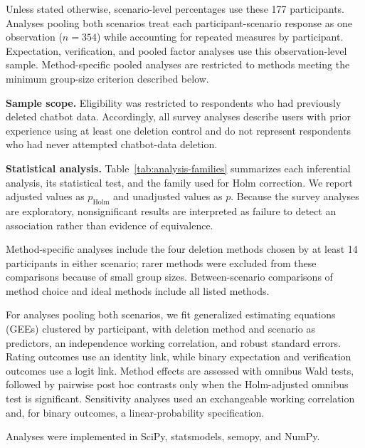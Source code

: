 \documentclass[conference,compsoc]{IEEEtran}
\begin{document}
Unless stated otherwise, scenario-level percentages use these 177 participants. Analyses pooling both scenarios treat each participant-scenario response as one observation ($n=354$) while accounting for repeated measures by participant. Expectation, verification, and pooled factor analyses use this observation-level sample. Method-specific pooled analyses are restricted to methods meeting the minimum group-size criterion described below.

\textbf{Sample scope.} Eligibility was restricted to respondents who had previously deleted chatbot data. Accordingly, all survey analyses describe users with prior experience using at least one deletion control and do not represent respondents who had never attempted chatbot-data deletion.

\textbf{Statistical analysis.} Table~\ref{tab:analysis-families} summarizes each inferential analysis, its statistical test, and the family used for Holm correction. We report adjusted values as $p_{\mathrm{Holm}}$ and unadjusted values as $p$. Because the survey analyses are exploratory, nonsignificant results are interpreted as failure to detect an association rather than evidence of equivalence.

Method-specific analyses include the four deletion methods chosen by at least 14 participants in either scenario; rarer methods were excluded from these comparisons because of small group sizes. Between-scenario comparisons of method choice and ideal methods include all listed methods.

For analyses pooling both scenarios, we fit generalized estimating equations (GEEs) clustered by participant, with deletion method and scenario as predictors, an independence working correlation, and robust standard errors. Rating outcomes use an identity link, while binary expectation and verification outcomes use a logit link. Method effects are assessed with omnibus Wald tests, followed by pairwise post hoc contrasts only when the Holm-adjusted omnibus test is significant. Sensitivity analyses used an exchangeable working correlation and, for binary outcomes, a linear-probability specification.

Analyses were implemented in SciPy, statsmodels, semopy, and NumPy.
\end{document}
